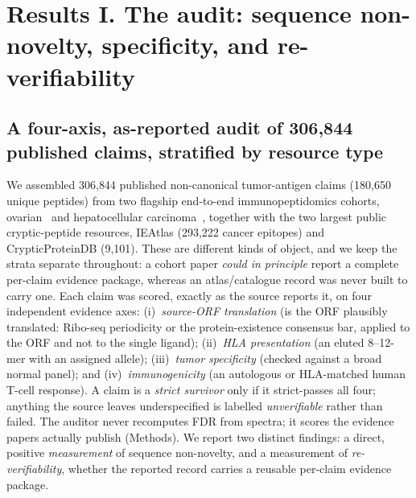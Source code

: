 \section{Results I. The audit: sequence non-novelty, specificity, and \mbox{re-verifiability}}

\subsection{A four-axis, as-reported audit of 306,844 published claims, stratified by resource type}
We assembled 306{,}844 published non-canonical tumor-antigen claims (180{,}650 unique peptides) from two flagship end-to-end immunopeptidomics cohorts, ovarian~\cite{r1} and hepatocellular carcinoma~\cite{r2}, together with the two largest public cryptic-peptide resources, IEAtlas (293{,}222 cancer epitopes) and CrypticProteinDB (9{,}101). These are different kinds of object, and we keep the strata separate throughout: a cohort paper \emph{could in principle} report a complete per-claim evidence package, whereas an atlas/catalogue record was never built to carry one. Each claim was scored, exactly as the source reports it, on four independent evidence axes: (i)~\emph{source-ORF translation} (is the ORF plausibly translated: Ribo-seq periodicity or the protein-existence consensus bar, applied to the ORF and not to the single ligand); (ii)~\emph{HLA presentation} (an eluted 8--12-mer with an assigned allele); (iii)~\emph{tumor specificity} (checked against a broad normal panel); and (iv)~\emph{immunogenicity} (an autologous or HLA-matched human T-cell response). A claim is a \emph{strict survivor} only if it strict-passes all four; anything the source leaves underspecified is labelled \emph{unverifiable} rather than failed. The auditor never recomputes FDR from spectra; it scores the evidence papers actually publish (Methods). We report two distinct findings: a direct, positive \emph{measurement} of sequence non-novelty, and a measurement of \emph{re-verifiability}, whether the reported record carries a reusable per-claim evidence package.

